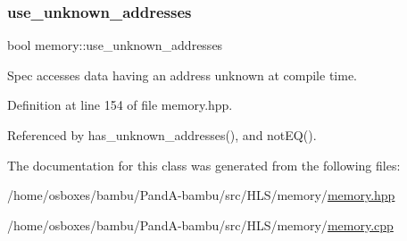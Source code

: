 \subsubsection{\texorpdfstring{use\+\_\+unknown\+\_\+addresses}{use\_unknown\_addresses}}
{\footnotesize\ttfamily bool memory\+::use\+\_\+unknown\+\_\+addresses\hspace{0.3cm}{\ttfamily [private]}}



Spec accesses data having an address unknown at compile time. 



Definition at line 154 of file memory.\+hpp.



Referenced by has\+\_\+unknown\+\_\+addresses(), and not\+E\+Q().



The documentation for this class was generated from the following files\+:\begin{DoxyCompactItemize}
\item 
/home/osboxes/bambu/\+Pand\+A-\/bambu/src/\+H\+L\+S/memory/\hyperlink{memory_8hpp}{memory.\+hpp}\item 
/home/osboxes/bambu/\+Pand\+A-\/bambu/src/\+H\+L\+S/memory/\hyperlink{memory_8cpp}{memory.\+cpp}\end{DoxyCompactItemize}
